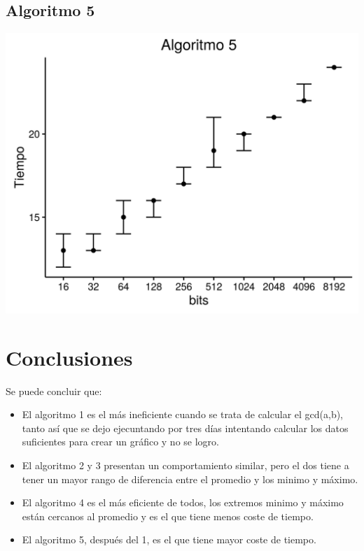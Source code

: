 \documentclass[12pt,letterpaper]{scrartcl}
\begin{document}
\newpage


\subsection{Algoritmo 5}

\begin{center}
	\includegraphics[scale=1]{plot/a5.png}
\end{center}	

\newpage



\section{Conclusiones}


Se puede concluir que:

\begin{itemize}

\item El algoritmo 1 es el más ineficiente cuando se trata de calcular el gcd(a,b), tanto así que se dejo ejecuntando por tres días intentando calcular los datos suficientes para crear un gráfico y no se logro.

\item El algoritmo 2 y 3 presentan un comportamiento similar, pero el dos tiene a tener un mayor rango de diferencia entre el promedio y los minimo y máximo.

\item El algoritmo 4 es el más eficiente de todos, los extremos minimo y máximo están cercanos al promedio y es el que tiene menos coste de tiempo.

\item El algoritmo 5, después del 1, es el que tiene mayor coste de tiempo.

\end{itemize}
\end{document}
